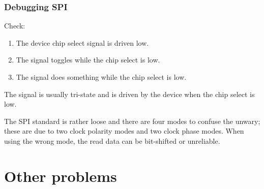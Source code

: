 
\subsubsection{Debugging SPI}
\label{debugging-spi}

Check:
%
\begin{enumerate}
\item The device chip select signal is driven low.
\item The  signal toggles while the chip select is low.
\item The  signal does something while the chip select is low.
\end{enumerate}
%
The  signal is usually tri-state and is driven by the
device when the chip select is low.

The SPI standard is rather loose and there are four modes to confuse
the unwary; these are due to two clock polarity modes and two clock
phase modes.  When using the wrong mode, the read data can be
bit-shifted or unreliable.


\section{Other problems}
\label{faq}

